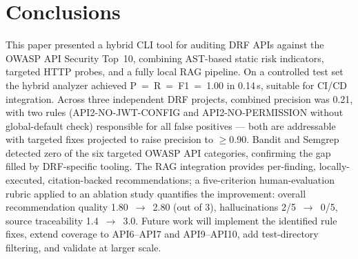\documentclass[conference]{IEEEtran}
\begin{document}
\section{Conclusions}

This paper presented a hybrid CLI tool for auditing DRF APIs against the
OWASP API Security Top~10, combining AST-based static risk indicators,
targeted HTTP probes, and a fully local RAG pipeline. On a controlled test
set the hybrid analyzer achieved P~=~R~=~F1~=~1.00 in 0.14\,s, suitable for
CI/CD integration. Across three independent DRF projects, combined precision
was 0.21, with two rules (API2-NO-JWT-CONFIG and API2-NO-PERMISSION without
global-default check) responsible for all false positives — both are
addressable with targeted fixes projected to raise precision to $\geq$0.90.
Bandit and Semgrep detected zero of the six targeted OWASP API categories,
confirming the gap filled by DRF-specific tooling. The RAG integration
provides per-finding, locally-executed, citation-backed recommendations; a
five-criterion human-evaluation rubric applied to an ablation study
quantifies the improvement: overall recommendation quality 1.80~$\to$~2.80
(out of 3), hallucinations 2/5~$\to$~0/5, source traceability 1.4~$\to$~3.0.
Future work will implement the identified rule fixes, extend coverage to
API6--API7 and API9--API10, add test-directory filtering, and validate at
larger scale.
\end{document}

